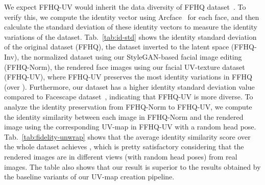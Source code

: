 \documentclass[10pt,twocolumn,letterpaper]{article}
\begin{document}
\begin{table}[!t]
\caption{Average identity similarity score between images in FFHQ-Norm and rendered images using FFHQ-UV. The score is averaged over the whole dataset. The ``negative samples'' is computed between the rendered image and an index-shifted real image. Note that the rendered images are in different views (with random head poses) from real images.}
\small
\centering
{}
\label{tab:fidelity-unwrap}
\end{table}
 

We expect FFHQ-UV would inherit the data diversity of FFHQ dataset~\cite{karras2019style}. 
To verify this, we compute the identity vector using Arcface~\cite{deng2019arcface} for each face, and then calculate the standard deviation of these identity vectors to measure the identity variations of the dataset. 
Tab.~\ref{tab:id-std} shows the identity standard deviation of the original dataset (FFHQ), the dataset inverted to the latent space (FFHQ-Inv), the normalized dataset using our StyleGAN-based facial image editing (FFHQ-Norm), the rendered face images using our facial UV-texture dataset (FFHQ-UV), where FFHQ-UV preserves the most identity variations in FFHQ (over ). 
Furthermore, our dataset has a higher identity standard deviation value compared to Facescape dataset~\cite{yang2020facescape}, indicating that FFHQ-UV is more diverse.
To analyze the identity preservation from FFHQ-Norm to FFHQ-UV, we compute the identity similarity between each image in FFHQ-Norm and the rendered image using the corresponding UV-map in FFHQ-UV with a random head pose. 
Tab.~\ref{tab:fidelity-unwrap} shows that the average identity similarity score over the whole dataset achieves , which is pretty satisfactory considering that the rendered images are in different views (with random head poses) from real images. 
The table also shows that our result is superior to the results obtained by the baseline variants of our UV-map creation pipeline. 
\end{document}
